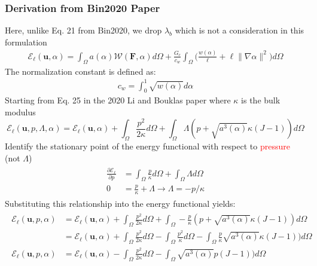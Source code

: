 \documentclass[12pt,3p]{article}
\numberwithin{equation}{section}
\begin{document}
\subsubsection{Derivation from Bin2020 Paper}
Here, unlike Eq. 21 from Bin2020, we drop $\lambda_b$ which is not a consideration in this formulation
\begin{align}
\mathcal{E}_{\ell}(\boldsymbol{u}, \alpha) = \int_{\Omega} a(\alpha) \mathcal{W}(\mathbf{F}, \alpha) d \Omega+\frac{G_{c}}{c_{w}} \int_{\Omega} \bigg(\frac{w(\alpha)}{\ell}+\ell\|\nabla \alpha\|^{2} \bigg) d \Omega 
\end{align}
The normalization constant is defined as: 
\begin{align}\label{NormConst} %
c_w=\int_0^1\sqrt{w(\alpha)}d\alpha
\end{align}
Starting from Eq. 25 in the 2020 Li and Bouklas paper where $\kappa$ is the bulk modulus 
\begin{equation}
\mathcal{E}_{\ell}\left(\boldsymbol{u}, p, \Lambda, \alpha\right) = \mathcal{E}_{\ell} (\boldsymbol{u}, \alpha ) + \int_{\Omega} \frac{p^{2}}{2 \kappa} d \Omega +\int_{\Omega} \Lambda(p+\sqrt{a^{3}(\alpha)} \kappa (J-1)) d \Omega
\end{equation}
Identify the stationary point of the energy functional with respect to \textcolor{red}{pressure} (not $\Lambda$)
\begin{align*}
\begin{split}
\frac{\partial \mathcal{E}_{\ell}}{\partial p} &= \int_{\Omega} \frac{p}{\kappa} d \Omega + \int_{\Omega} \Lambda d \Omega \\
0 &= \frac{p}{\kappa} + \Lambda \rightarrow \Lambda = -p/\kappa 
\end{split}
\end{align*}
Substituting this relationship into the energy functional yields: 
\begin{align}
\begin{split}
\mathcal{E}_{\ell}\left(\boldsymbol{u}, p, \alpha\right) &= \mathcal{E}_{\ell} (\boldsymbol{u}, \alpha ) + \int_{\Omega} \frac{p^{2}}{2 \kappa} d \Omega +\int_{\Omega} - \frac{p}{\kappa} (p+\sqrt{a^{3}(\alpha)} \kappa (J-1)) d \Omega \\
		&= \mathcal{E}_{\ell} (\boldsymbol{u}, \alpha ) + \int_{\Omega} \frac{p^{2}}{2 \kappa} d \Omega -\int_{\Omega} \frac{p^2}{\kappa} d \Omega - \int_{\Omega} \frac{p}{\kappa} \sqrt{a^{3}(\alpha)} \kappa (J-1)) d \Omega \\
\mathcal{E}_{\ell}\left(\boldsymbol{u}, p, \alpha\right) &= \mathcal{E}_{\ell} (\boldsymbol{u}, \alpha ) - \int_{\Omega} \frac{p^{2}}{2 \kappa} d \Omega - \int_{\Omega} \sqrt{a^{3}(\alpha)} p(J-1)) d \Omega
\end{split}
\end{align}
\end{document}

